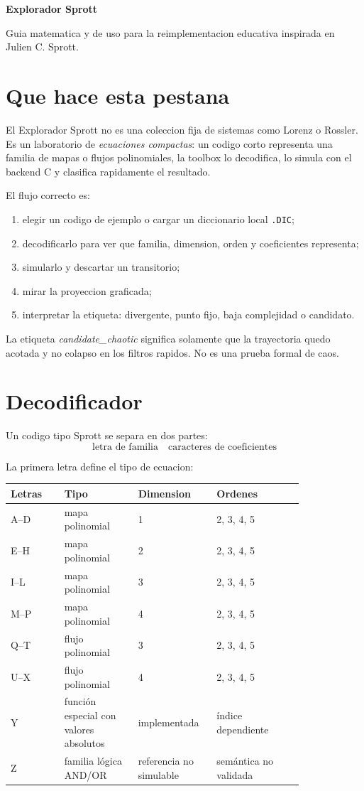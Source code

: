 \documentclass[11pt]{article}
\newcommand{\code}[1]{\texttt{#1}}
\begin{document}
{\LARGE\bfseries Explorador Sprott}\par
{\small Guia matematica y de uso para la reimplementacion educativa inspirada en Julien C. Sprott.}\par
\vspace{0.8em}
\tableofcontents
\newpage

\section{Que hace esta pestana}

El Explorador Sprott no es una coleccion fija de sistemas como Lorenz o Rossler. Es un
laboratorio de \emph{ecuaciones compactas}: un codigo corto representa una familia de
mapas o flujos polinomiales, la toolbox lo decodifica, lo simula con el backend C y
clasifica rapidamente el resultado.

El flujo correcto es:
\begin{enumerate}
  \item elegir un codigo de ejemplo o cargar un diccionario local \code{.DIC};
  \item decodificarlo para ver que familia, dimension, orden y coeficientes representa;
  \item simularlo y descartar un transitorio;
  \item mirar la proyeccion graficada;
  \item interpretar la etiqueta: divergente, punto fijo, baja complejidad o candidato.
\end{enumerate}

La etiqueta \emph{candidate\_chaotic} significa solamente que la trayectoria quedo acotada
y no colapso en los filtros rapidos. No es una prueba formal de caos.

\section{Decodificador}

Un codigo tipo Sprott se separa en dos partes:
\[
\boxed{\text{letra de familia}}\quad\boxed{\text{caracteres de coeficientes}}
\]

La primera letra define el tipo de ecuacion:
\begin{longtable}{p{0.16\linewidth}p{0.22\linewidth}p{0.18\linewidth}p{0.26\linewidth}}
\toprule
Letras & Tipo & Dimension & Ordenes \\
\midrule
\endhead
A--D & mapa polinomial & 1 & 2, 3, 4, 5 \\
E--H & mapa polinomial & 2 & 2, 3, 4, 5 \\
I--L & mapa polinomial & 3 & 2, 3, 4, 5 \\
M--P & mapa polinomial & 4 & 2, 3, 4, 5 \\
Q--T & flujo polinomial & 3 & 2, 3, 4, 5 \\
U--X & flujo polinomial & 4 & 2, 3, 4, 5 \\
Y & función especial con valores absolutos & implementada & índice dependiente \\
Z & familia lógica AND/OR & referencia no simulable & semántica no validada \\
\bottomrule
\end{longtable}
\end{document}
